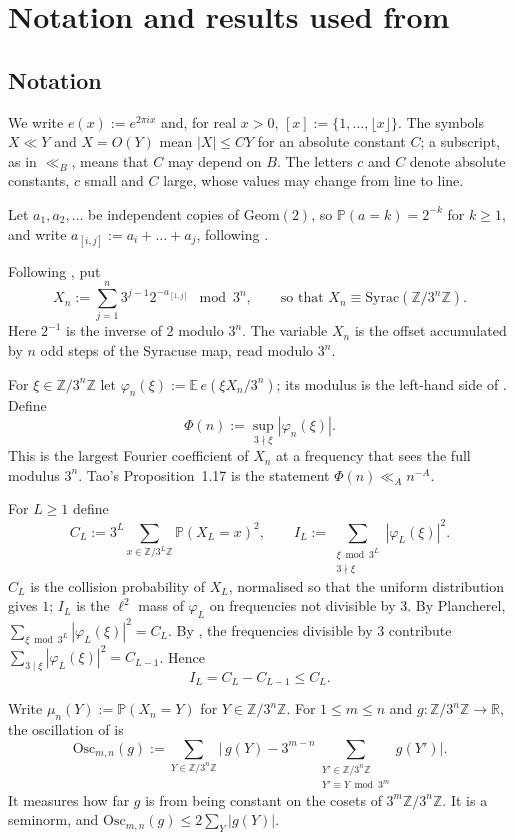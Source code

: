 \documentclass[11pt]{amsart}
\theoremstyle{remark}
\newcommand{\E}{\mathbb{E}}
\renewcommand{\P}{\mathbb{P}}
\newcommand{\Z}{\mathbb{Z}}
\newcommand{\Syrac}{\mathrm{Syrac}}
\newcommand{\Osc}{\mathrm{Osc}}
\newcommand{\Geom}{\mathrm{Geom}}
\newcommand{\T}[1]{\cite[#1]{Tao22}}   %
\newcommand{\Tc}{\cite{Tao22}}         %
\theoremstyle{plain}
\begin{document}
\section[Notation and results used from {\Tc}]{Notation and results used from \Tc}\label{sec:notation}

\subsection{Notation}

We write $e(x):=e^{2\pi i x}$ and, for real $x>0$, $[x]:=\{1,\dots,\lfloor x\rfloor\}$. The symbols $X\ll Y$ and $X=O(Y)$ mean $|X|\le CY$ for an absolute constant $C$; a subscript, as in $\ll_B$, means that $C$ may depend on $B$. The letters $c$ and $C$ denote absolute constants, $c$ small and $C$ large, whose values may change from line to line.

Let $a_1,a_2,\dots$ be independent copies of $\Geom(2)$, so $\P(a=k)=2^{-k}$ for $k\ge1$, and write $a_{[i,j]}:=a_i+\dots+a_j$, following \T{(1.6)}.

Following \T{(1.29)}, put
\[
X_n:=\sum_{j=1}^{n}3^{j-1}2^{-a_{[1,j]}}\ \bmod 3^n,\qquad\text{so that } X_n\equiv\Syrac(\Z/3^n\Z).
\]
Here $2^{-1}$ is the inverse of $2$ modulo $3^n$. The variable $X_n$ is the offset accumulated by $n$ odd steps of the Syracuse map, read modulo $3^n$.

For $\xi\in\Z/3^n\Z$ let $\varphi_n(\xi):=\E\,e(\xi X_n/3^n)$; its modulus is the left-hand side of \T{(1.28)}. Define
\[
\Phi(n):=\sup_{3\nmid\xi}|\varphi_n(\xi)|.
\]
This is the largest Fourier coefficient of $X_n$ at a frequency that sees the full modulus $3^n$. Tao's Proposition~1.17 is the statement $\Phi(n)\ll_A n^{-A}$.

For $L\ge1$ define
\[
C_L:=3^L\sum_{x\in\Z/3^L\Z}\P(X_L=x)^2,\qquad I_L:=\sum_{\substack{\xi\bmod 3^L\\ 3\nmid\xi}}|\varphi_L(\xi)|^2 .
\]
$C_L$ is the collision probability of $X_L$, normalised so that the uniform distribution gives $1$; $I_L$ is the $\ell^2$ mass of $\varphi_L$ on frequencies not divisible by $3$. By Plancherel, $\sum_{\xi\bmod 3^L}|\varphi_L(\xi)|^2=C_L$. By \T{(1.23)}, the frequencies divisible by $3$ contribute $\sum_{3\mid\xi}|\varphi_L(\xi)|^2=C_{L-1}$. Hence
\[
I_L=C_L-C_{L-1}\le C_L .
\]

Write $\mu_n(Y):=\P(X_n=Y)$ for $Y\in\Z/3^n\Z$. For $1\le m\le n$ and $g\colon\Z/3^n\Z\to\mathbb R$, the oscillation of \T{(1.27)} is
\[
\Osc_{m,n}(g):=\sum_{Y\in\Z/3^n\Z}\Big|\,g(Y)-3^{m-n}\!\!\sum_{\substack{Y'\in\Z/3^n\Z\\ Y'\equiv Y\bmod 3^m}}\!\! g(Y')\Big|.
\]
It measures how far $g$ is from being constant on the cosets of $3^m\Z/3^n\Z$. It is a seminorm, and $\Osc_{m,n}(g)\le2\sum_Y|g(Y)|$.
\end{document}
